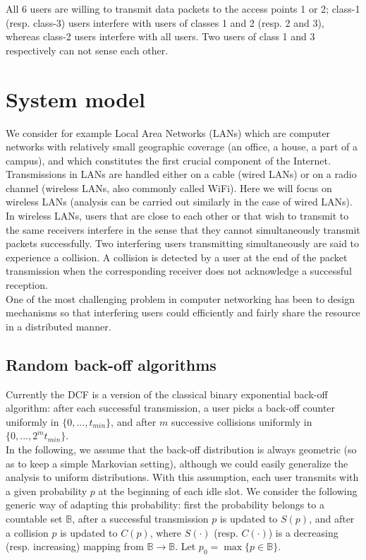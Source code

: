\documentclass[letterpaper,english,10pt]{article}
\begin{document}
All 6 users are willing to transmit data packets to the access points 1 or 2; class-1 (resp. class-3) users interfere with users of classes 1 and 2 (resp. 2 and 3), whereas class-2 users interfere with all users. Two users of class 1 and 3 respectively can not sense each
other.

\section{System model}

We consider for example Local Area Networks (LANs) which are computer networks with relatively small geographic coverage (an office, a house, a part of a campus), and which constitutes the first crucial component of the Internet. \\

Transmissions in LANs are handled either on a cable (wired LANs) or on a radio channel (wireless LANs, also commonly called WiFi). Here we will focus on wireless LANs (analysis can be carried out similarly in the case of wired LANs). \\

In wireless LANs, users that are close to each other or that wish to transmit to the same receivers interfere in the sense that they cannot simultaneously transmit packets successfully. Two interfering users transmitting simultaneously are said to experience a collision. A collision is detected by a user at the end of the packet transmission when the corresponding receiver does not acknowledge a successful reception. \\

One of the most challenging problem in computer networking has been to design mechanisms so that interfering users could efficiently and fairly share the resource in a distributed manner.\\

\subsection{Random back-off algorithms} Currently the DCF is a version of the classical binary exponential back-off algorithm: after each successful transmission, a user picks a back-off counter uniformly in $\{0, . . . , t_{min}\}$, and after $m$ successive collisions uniformly in $\{0, . . . , 2^mt_{min}\}$.\\

In the following, we assume that the back-off distribution is always geometric (so as to keep a simple Markovian setting), although we could easily generalize the analysis to uniform distributions. With this assumption, each user transmits with a given probability $p$ at the beginning of each idle slot.
We consider the following generic way of adapting this probability: first the probability belongs to a countable set $\mathbb{B}$, after a successful transmission $p$ is updated to $S(p)$, and after a collision $p$ is updated to $C(p)$, where $S(·)$ (resp. $C(·)$) is a decreasing (resp. increasing) mapping from $\mathbb{B} \to \mathbb{B}$. Let $p_0 = \max\{p \in \mathbb{B}\}$.
\end{document}
